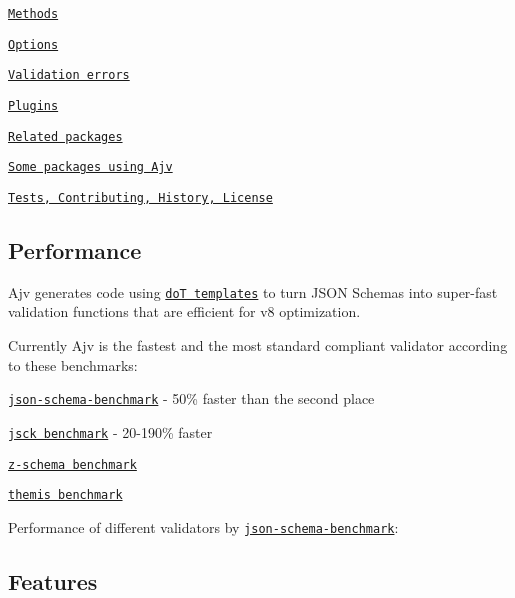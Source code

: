 \begin{DoxyItemize}
\begin{DoxyItemize}
\item \href{#api}{\tt Methods}
\item \href{#options}{\tt Options}
\item \href{#validation-errors}{\tt Validation errors}
\end{DoxyItemize}
\item \href{#plugins}{\tt Plugins}
\item \href{#related-packages}{\tt Related packages}
\item \href{#some-packages-using-ajv}{\tt Some packages using Ajv}
\item \href{#tests}{\tt Tests, Contributing, History, License}
\end{DoxyItemize}

\subsection*{Performance}

Ajv generates code using \href{https://github.com/olado/doT}{\tt doT templates} to turn J\+S\+ON Schemas into super-\/fast validation functions that are efficient for v8 optimization.

Currently Ajv is the fastest and the most standard compliant validator according to these benchmarks\+:


\begin{DoxyItemize}
\item \href{https://github.com/ebdrup/json-schema-benchmark}{\tt json-\/schema-\/benchmark} -\/ 50\% faster than the second place
\item \href{https://github.com/pandastrike/jsck#benchmarks}{\tt jsck benchmark} -\/ 20-\/190\% faster
\item \href{https://rawgit.com/zaggino/z-schema/master/benchmark/results.html}{\tt z-\/schema benchmark}
\item \href{https://cdn.rawgit.com/playlyfe/themis/master/benchmark/results.html}{\tt themis benchmark}
\end{DoxyItemize}

Performance of different validators by \href{https://github.com/ebdrup/json-schema-benchmark}{\tt json-\/schema-\/benchmark}\+:

\href{https://github.com/ebdrup/json-schema-benchmark/blob/master/README.md#performance}{\tt }

\subsection*{Features}



